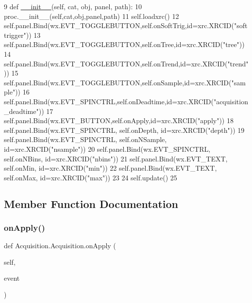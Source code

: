 \begin{DoxyCode}
9     \textcolor{keyword}{def }\hyperlink{classwrapper_1_1ModuleDictWrapper_a9a7a794150502f51df687831583e13b9}{\_\_init\_\_}(self, cat, obj, panel, path):
10         proc.\_\_init\_\_(self,cat,obj,panel,path)
11         self.loadxrc()
12         self.panel.Bind(wx.EVT\_TOGGLEBUTTON,self.onSoftTrig,id=xrc.XRCID(\textcolor{stringliteral}{"softtrigger"}))
13         self.panel.Bind(wx.EVT\_TOGGLEBUTTON,self.onTree,id=xrc.XRCID(\textcolor{stringliteral}{"tree"}))
14         self.panel.Bind(wx.EVT\_TOGGLEBUTTON,self.onTrend,id=xrc.XRCID(\textcolor{stringliteral}{"trend"}))
15         self.panel.Bind(wx.EVT\_TOGGLEBUTTON,self.onSample,id=xrc.XRCID(\textcolor{stringliteral}{"sample"}))
16         self.panel.Bind(wx.EVT\_SPINCTRL,self.onDeadtime,id=xrc.XRCID(\textcolor{stringliteral}{"acquisition\_deadtime"}))
17         self.panel.Bind(wx.EVT\_BUTTON,self.onApply,id=xrc.XRCID(\textcolor{stringliteral}{"apply"}))
18         self.panel.Bind(wx.EVT\_SPINCTRL, self.onDepth, id=xrc.XRCID(\textcolor{stringliteral}{"depth"}))
19         self.panel.Bind(wx.EVT\_SPINCTRL, self.onNSample, id=xrc.XRCID(\textcolor{stringliteral}{"nsample"}))
20         self.panel.Bind(wx.EVT\_SPINCTRL, self.onNBins, id=xrc.XRCID(\textcolor{stringliteral}{"nbins"}))
21         self.panel.Bind(wx.EVT\_TEXT, self.onMin, id=xrc.XRCID(\textcolor{stringliteral}{"min"}))
22         self.panel.Bind(wx.EVT\_TEXT, self.onMax, id=xrc.XRCID(\textcolor{stringliteral}{"max"}))
23 
24         self.update()
25 
\end{DoxyCode}


\subsection{Member Function Documentation}
\mbox{\label{classAcquisition_1_1Acquisition_ac7be703152b5ec0e02bc9c742d59cd50}} 
\subsubsection{\texorpdfstring{on\+Apply()}{onApply()}}
{\footnotesize\ttfamily def Acquisition.\+Acquisition.\+on\+Apply (\begin{DoxyParamCaption}\item[{}]{self,  }\item[{}]{event }\end{DoxyParamCaption})}



